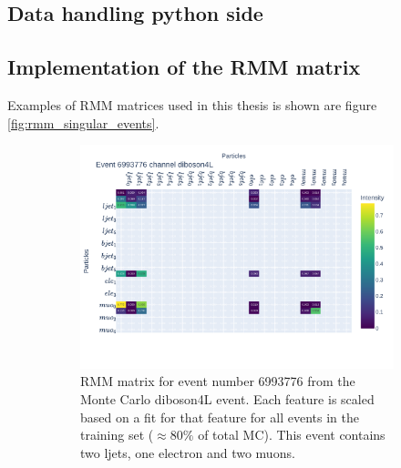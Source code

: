\subsection*{Data handling python side}



\subsection*{Implementation of the RMM matrix}
Examples of RMM matrices used in this thesis is shown are figure \ref{fig:rmm_singular_events}. 


\begin{figure}[H]
    \centering
    \begin{subfigure}{.8\textwidth}
        \includegraphics[width=\textwidth]{Figures/rmms/rmm_event_6993776_diboson4L.pdf}
        \caption{RMM matrix for event number 6993776 from the Monte Carlo diboson4L event. Each feature is scaled based on a fit for that feature for 
        all events in the training set ($\approx 80\%$ of total MC). This event contains two ljets, one electron and two muons.}
        \label{fig:rmm_dib4l_event}
    \end{subfigure}
    \hfill
    \begin{subfigure}{.8\textwidth}

\end{subfigure}
\end{figure}
